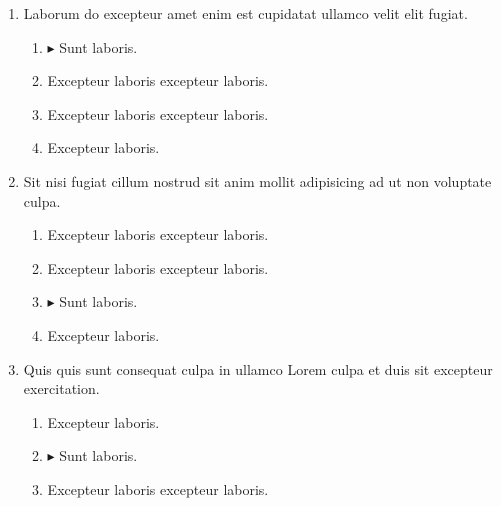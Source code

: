 \documentclass[a4paper,12pt]{article}
\begin{document}
\begin{enumerate}[label=\textbf{\arabic*.}]
\begin{multicols}{2}
\begin{enumerate}
		\item  Excepteur laboris excepteur laboris.
    
	\end{enumerate}

\end{multicols}
\item Laborum do excepteur amet enim est cupidatat ullamco velit elit fugiat.
\begin{multicols}{2}
	\begin{enumerate}
		\item $\blacktriangleright$  Sunt laboris.
    
		\item  Excepteur laboris excepteur laboris.
    
		\item  Excepteur laboris excepteur laboris.
  
		\item  Excepteur laboris.
    
	\end{enumerate}

\end{multicols}
\item Sit nisi fugiat cillum nostrud sit anim mollit adipisicing ad ut non voluptate culpa.
\begin{multicols}{2}
	\begin{enumerate}
		\item  Excepteur laboris excepteur laboris.
  
		\item  Excepteur laboris excepteur laboris.
    
		\item $\blacktriangleright$  Sunt laboris.
    
		\item  Excepteur laboris.
    
	\end{enumerate}

\end{multicols}
\item Quis quis sunt consequat culpa in ullamco Lorem culpa et duis sit excepteur exercitation.
\begin{multicols}{2}
	\begin{enumerate}
		\item  Excepteur laboris.
    
		\item $\blacktriangleright$  Sunt laboris.
    
		\item  Excepteur laboris excepteur laboris.
  

\end{enumerate}
\end{multicols}
\end{enumerate}
\end{document}
